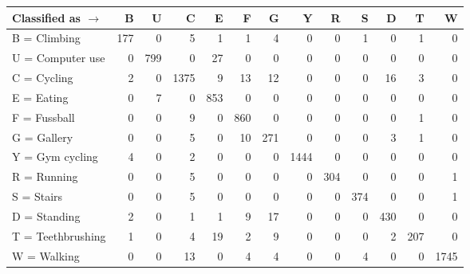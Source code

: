 \begin{tabular}{lrrrrrrrrrrrr}
\toprule
Classified as $\rightarrow$ &    B &    U &     C &    E &    F &    G &     Y &    R &    S &    D &    T &     W \\
\midrule
B = Climbing      &  177 &    0 &     5 &    1 &    1 &    4 &     0 &    0 &    1 &    0 &    1 &     0 \\
U = Computer use  &    0 &  799 &     0 &   27 &    0 &    0 &     0 &    0 &    0 &    0 &    0 &     0 \\
C = Cycling       &    2 &    0 &  1375 &    9 &   13 &   12 &     0 &    0 &    0 &   16 &    3 &     0 \\
E = Eating        &    0 &    7 &     0 &  853 &    0 &    0 &     0 &    0 &    0 &    0 &    0 &     0 \\
F = Fussball      &    0 &    0 &     9 &    0 &  860 &    0 &     0 &    0 &    0 &    0 &    1 &     0 \\
G = Gallery       &    0 &    0 &     5 &    0 &   10 &  271 &     0 &    0 &    0 &    3 &    1 &     0 \\
Y = Gym cycling   &    4 &    0 &     2 &    0 &    0 &    0 &  1444 &    0 &    0 &    0 &    0 &     0 \\
R = Running       &    0 &    0 &     5 &    0 &    0 &    0 &     0 &  304 &    0 &    0 &    0 &     1 \\
S = Stairs        &    0 &    0 &     5 &    0 &    0 &    0 &     0 &    0 &  374 &    0 &    0 &     1 \\
D = Standing      &    2 &    0 &     1 &    1 &    9 &   17 &     0 &    0 &    0 &  430 &    0 &     0 \\
T = Teethbrushing &    1 &    0 &     4 &   19 &    2 &    9 &     0 &    0 &    0 &    2 &  207 &     0 \\
W = Walking       &    0 &    0 &    13 &    0 &    4 &    4 &     0 &    0 &    4 &    0 &    0 &  1745 \\
\bottomrule
\end{tabular}
